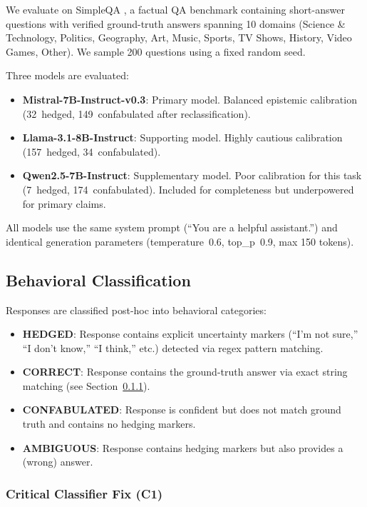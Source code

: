 \documentclass[11pt,a4paper]{article}
\begin{document}
We evaluate on SimpleQA \citep{wei2024simpleqa}, a factual QA benchmark containing short-answer questions with verified ground-truth answers spanning 10 domains (Science \& Technology, Politics, Geography, Art, Music, Sports, TV Shows, History, Video Games, Other). We sample 200 questions using a fixed random seed.

Three models are evaluated:
\begin{itemize}[nosep]
    \item \textbf{Mistral-7B-Instruct-v0.3}: Primary model. Balanced epistemic calibration (32~hedged, 149~confabulated after reclassification).
    \item \textbf{Llama-3.1-8B-Instruct}: Supporting model. Highly cautious calibration (157~hedged, 34~confabulated).
    \item \textbf{Qwen2.5-7B-Instruct}: Supplementary model. Poor calibration for this task (7~hedged, 174~confabulated). Included for completeness but underpowered for primary claims.
\end{itemize}

All models use the same system prompt (``You are a helpful assistant.'') and identical generation parameters (temperature~0.6, top\_p~0.9, max 150 tokens).

\subsection{Behavioral Classification}
\label{sec:behavioral}

Responses are classified post-hoc into behavioral categories:

\begin{itemize}[nosep]
    \item \textbf{HEDGED}: Response contains explicit uncertainty markers (``I'm not sure,'' ``I don't know,'' ``I think,'' etc.) detected via regex pattern matching.
    \item \textbf{CORRECT}: Response contains the ground-truth answer via exact string matching (see Section~\ref{sec:c1fix}).
    \item \textbf{CONFABULATED}: Response is confident but does not match ground truth and contains no hedging markers.
    \item \textbf{AMBIGUOUS}: Response contains hedging markers but also provides a (wrong) answer.
\end{itemize}

\subsubsection{Critical Classifier Fix (C1)}
\label{sec:c1fix}
\end{document}
